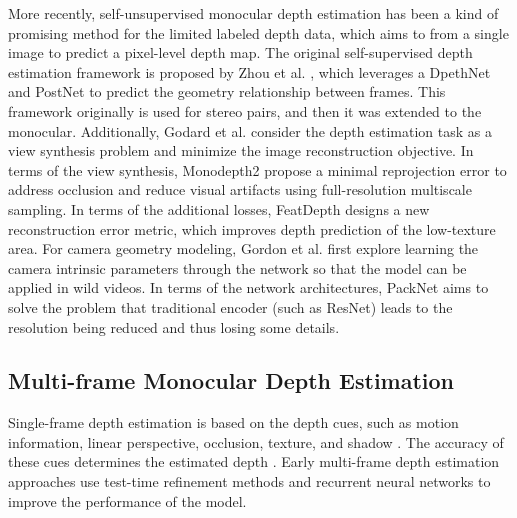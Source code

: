 \documentclass[journal]{IEEEtran}
\begin{document}
More recently, self-unsupervised monocular depth estimation has been a kind of promising method for the limited labeled depth data, which aims to from a single image to predict a pixel-level depth map. The original self-supervised depth estimation framework is proposed by Zhou et al. \cite{zhou2017unsupervised}, which leverages a DpethNet and PostNet to predict the geometry relationship between frames. This framework originally is used for stereo pairs, and then it was extended to the monocular. Additionally, Godard et al.\cite{godard2017unsupervised} consider the depth estimation task as a view synthesis problem and minimize the image reconstruction objective. In terms of the view synthesis, Monodepth2 \cite{monodepth2} propose a minimal reprojection error to address occlusion and reduce visual artifacts using full-resolution multiscale sampling. In terms of the additional losses, FeatDepth \cite{shu2020feature} designs a new reconstruction error metric, which improves depth prediction of the low-texture area. For camera geometry modeling, Gordon et al. \cite{gordon2019depth} first explore learning the camera intrinsic parameters through the network so that the model can be applied in wild videos. In terms of the network architectures, PackNet \cite{guizilini20203d} aims to solve the problem that traditional encoder (such as ResNet) leads to the resolution being reduced and thus losing some details. 


\subsection{Multi-frame Monocular Depth Estimation}

Single-frame depth estimation is based on the depth cues, such as motion information, linear perspective, occlusion, texture, and shadow \cite{kumar2018depth, wei2021iterative, lee2016adaptive}. The accuracy of these cues determines the estimated depth \cite{zhou2017unsupervised,godard2017unsupervised,monodepth2,shu2020feature,gordon2019depth,guizilini20203d}. Early multi-frame depth estimation approaches use test-time refinement methods \cite{casser2019,chen2019self,luo2020consistent,mccraith2020monocular,shu2020feature,kuznietsov2021comoda} and recurrent neural networks \cite{cs2018depthnet, patil2020don} to improve the performance of the model. 
\end{document}

